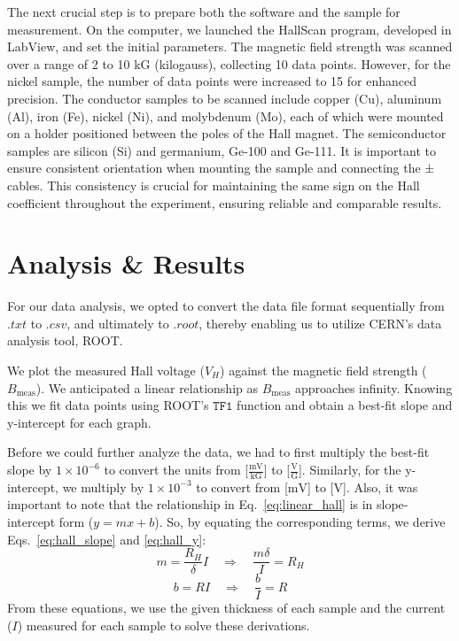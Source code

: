 \documentclass[a4paper,12pt,english]{all-in-one} %
\begin{document}
\begin{multicols}{2}
{The next crucial step is to prepare both the software and the sample for measurement. On the computer, we launched the HallScan program, developed in LabView, and set the initial parameters. The magnetic field strength was scanned over a range of 2 to 10 kG (kilogauss), collecting 10 data points. However, for the nickel sample, the number of data points were increased to 15 for enhanced precision. The conductor samples to be scanned include copper (Cu), aluminum (Al), iron (Fe), nickel (Ni), and molybdenum (Mo), each of which were mounted on a holder positioned between the poles of the Hall magnet. The semiconductor samples are silicon (Si) and germanium, Ge-100 and Ge-111. It is important to ensure consistent orientation when mounting the sample and connecting the ± cables. This consistency is crucial for maintaining the same sign on the Hall coefficient throughout the experiment, ensuring reliable and comparable results.
}

\section*{Analysis \& Results}
{
For our data analysis, we opted to convert the data file format sequentially from $.txt$ to $.csv$, and ultimately to $.root$, thereby enabling us to utilize CERN's data analysis tool, ROOT.

We plot the measured Hall voltage ($V_{H}$) against the magnetic field strength ($B_{\text{meas}}$). We anticipated a linear relationship as $B_{\text{meas}}$ approaches infinity. Knowing this we fit data points using ROOT's $\texttt{TF1}$ function and obtain a best-fit slope and y-intercept for each graph.

Before we could further analyze the data, we had to first multiply the best-fit slope by $1 \times 10^{-6}$ to convert the units from [$\frac{\text{mV}}{\text{kG}}$] to [$\frac{\text{V}}{\text{G}}$]. Similarly, for the y-intercept, we multiply by $1 \times 10^{-3}$ to convert from [$\text{mV}$] to [$\text{V}$]. Also, it was important to note that the relationship in Eq.~\eqref{eq:linear_hall} is in slope-intercept form ($y = mx + b$). So, by equating the corresponding terms, we derive Eqs.~\eqref{eq:hall_slope} and \eqref{eq:hall_y}:
\begin{equation}\label{eq:hall_slope}
m = \frac{R_H}{\delta}I \quad \Rightarrow \quad \frac{m\delta}{I}  = R_H
\end{equation}
\begin{equation}\label{eq:hall_y}
b = RI \quad \Rightarrow \quad \frac{b}{I} = R
\end{equation}
From these equations, we use the given thickness of each sample and the current ($I$) measured for each sample to solve these derivations.

}
\end{multicols}
\end{document}
